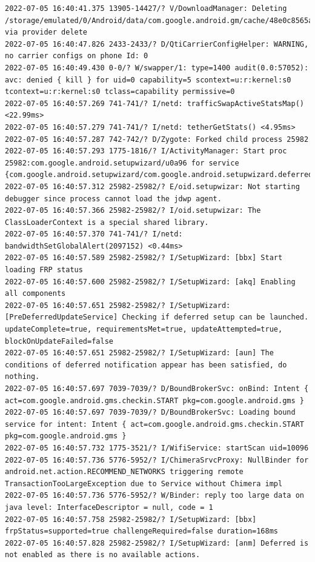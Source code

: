 \documentclass[a4paper,12pt]{book}
\begin{document}
\begin{lstlisting}
2022-07-05 16:40:41.375 13905-14427/? V/DownloadManager: Deleting /storage/emulated/0/Android/data/com.google.android.gm/cache/48e0c8565afb417ed2b7006708d0a804 via provider delete
2022-07-05 16:40:47.826 2433-2433/? D/QtiCarrierConfigHelper: WARNING, no carrier configs on phone Id: 0
2022-07-05 16:40:49.430 0-0/? W/swapper/1: type=1400 audit(0.0:57052): avc: denied { kill } for uid=0 capability=5 scontext=u:r:kernel:s0 tcontext=u:r:kernel:s0 tclass=capability permissive=0
2022-07-05 16:40:57.269 741-741/? I/netd: trafficSwapActiveStatsMap() <22.99ms>
2022-07-05 16:40:57.279 741-741/? I/netd: tetherGetStats() <4.95ms>
2022-07-05 16:40:57.287 742-742/? D/Zygote: Forked child process 25982
2022-07-05 16:40:57.293 1775-1816/? I/ActivityManager: Start proc 25982:com.google.android.setupwizard/u0a96 for service {com.google.android.setupwizard/com.google.android.setupwizard.deferred.DeferredSetupScheduler}
2022-07-05 16:40:57.312 25982-25982/? E/oid.setupwizar: Not starting debugger since process cannot load the jdwp agent.
2022-07-05 16:40:57.366 25982-25982/? I/oid.setupwizar: The ClassLoaderContext is a special shared library.
2022-07-05 16:40:57.370 741-741/? I/netd: bandwidthSetGlobalAlert(2097152) <0.44ms>
2022-07-05 16:40:57.589 25982-25982/? I/SetupWizard: [bbx] Start loading FRP status
2022-07-05 16:40:57.600 25982-25982/? I/SetupWizard: [akq] Enabling all components
2022-07-05 16:40:57.651 25982-25982/? I/SetupWizard: [PreDeferredUpdateService] Checking if deferred setup can be launched. updateComplete=true, requirementsMet=true, updateAttempted=true, blockOnUpdateFailed=false
2022-07-05 16:40:57.651 25982-25982/? I/SetupWizard: [aun] The conditions of deferred notification appear has been satisfied, do nothing.
2022-07-05 16:40:57.697 7039-7039/? D/BoundBrokerSvc: onBind: Intent { act=com.google.android.gms.checkin.START pkg=com.google.android.gms }
2022-07-05 16:40:57.697 7039-7039/? D/BoundBrokerSvc: Loading bound service for intent: Intent { act=com.google.android.gms.checkin.START pkg=com.google.android.gms }
2022-07-05 16:40:57.732 1775-3521/? I/WifiService: startScan uid=10096
2022-07-05 16:40:57.736 5776-5952/? I/ChimeraSrvcProxy: NullBinder for android.net.action.RECOMMEND_NETWORKS triggering remote TransactionTooLargeException due to Service without Chimera impl
2022-07-05 16:40:57.736 5776-5952/? W/Binder: reply too large data on java level: InterfaceDescriptor = null, code = 1
2022-07-05 16:40:57.758 25982-25982/? I/SetupWizard: [bbx] frpStatus=supported=true challengeRequired=false duration=168ms
2022-07-05 16:40:57.828 25982-25982/? I/SetupWizard: [anm] Deferred is not enabled as there is no available actions.

\end{lstlisting}
\end{document}
